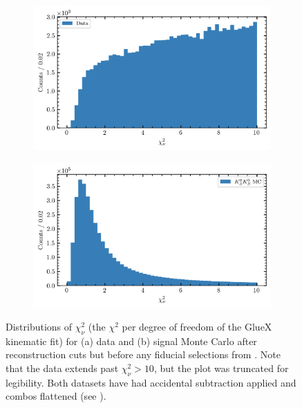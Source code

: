 \begin{figure}
  \begin{center}
    \begin{subfigure}[b]{.8\columnwidth}
      \includegraphics[width=1\linewidth]{figures/chisqdof_data_accpol.png}
      \caption{}
      \label{fig:chisqdof-data}
    \end{subfigure}
    \begin{subfigure}[b]{.8\columnwidth}
      \includegraphics[width=1\linewidth]{figures/chisqdof_accmc_accpol.png}
      \caption{}
      \label{fig:chisqdof-mc}
    \end{subfigure}
  \end{center}
  \caption{Distributions of $\chi^2_\nu$ (the $\chi^2$ per degree of freedom of the GlueX kinematic fit) for (a) data and (b) signal Monte Carlo after reconstruction cuts but before any fiducial selections from . Note that the data extends past $\chi^2_\nu > 10$, but the plot was truncated for legibility. Both datasets have had accidental subtraction applied and combos flattened (see ).}\label{fig:chisqdof-initial}
\end{figure}


